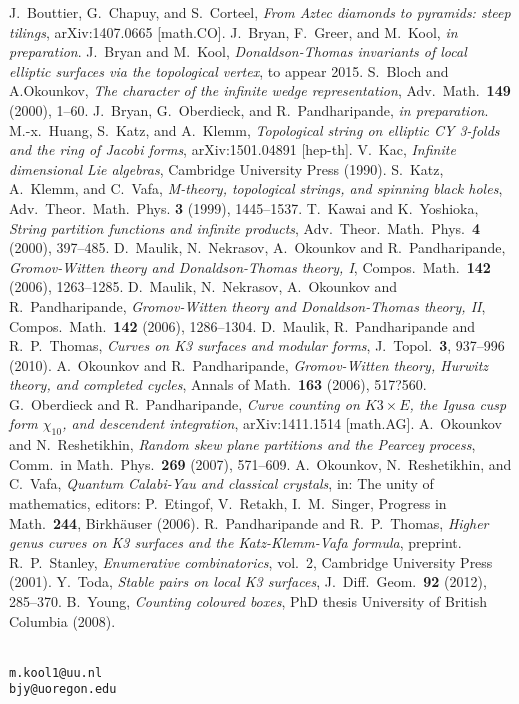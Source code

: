 \documentclass{amsart}
\theoremstyle{definition}
\begin{document}
%
%

\begin{thebibliography}{MNOP}
 J.~Bouttier, G.~Chapuy, and S.~Corteel, \textit{From Aztec diamonds to pyramids: steep tilings}, arXiv:1407.0665 [math.CO].
 J.~Bryan, F.~Greer, and M.~Kool, \emph{in preparation}.
 J.~Bryan and M.~Kool, \textit{Donaldson-Thomas invariants of local elliptic surfaces via the topological vertex}, to appear 2015.
 S.~Bloch and A.Okounkov, \textit{The character of the infinite wedge representation}, Adv.~Math.~\textbf{149} (2000), 1--60.
 J.~Bryan, G.~Oberdieck, and R.~Pandharipande, \emph{in preparation}.
 M.-x.~Huang, S.~Katz, and A.~Klemm, \textit{Topological string on elliptic CY 3-folds and the ring of Jacobi forms}, arXiv:1501.04891 [hep-th].
 V.~Kac, \textit{Infinite dimensional Lie algebras}, Cambridge University Press (1990).
 S.~Katz, A.~Klemm, and C.~Vafa, \textit{M-theory, topological strings, and spinning black holes}, Adv.~Theor.~Math.~Phys. \textbf{3} (1999), 1445--1537.
 T.~Kawai and K.~Yoshioka, \emph{String partition functions and infinite products}, Adv.~Theor.~Math.~Phys.~\textbf{4} (2000), 397--485.
 D.~Maulik, N.~Nekrasov, A.~Okounkov and R.~Pandharipande, \textit{Gromov-{W}itten theory and {D}onaldson-{T}homas theory, {I}}, Compos.~Math.~\textbf{142} (2006), 1263--1285. %
 D.~Maulik, N.~Nekrasov, A.~Okounkov and R.~Pandharipande, \textit{Gromov-{W}itten theory and {D}onaldson-{T}homas theory, {II}}, Compos.~Math.~\textbf{142} (2006), 1286--1304. 
 D.~Maulik, R.~Pandharipande and R.~P.~Thomas, \textit{Curves on K3 surfaces and modular forms}, J.~Topol.~\textbf{3}, 937--996 (2010). %
 A.~Okounkov and R.~Pandharipande, \textit{Gromov-Witten theory, Hurwitz theory, and completed cycles}, Annals of Math.~\textbf{163} (2006), 517?560.
 G.~Oberdieck and R.~Pandharipande, \textit{Curve counting on $K3 \times E$, the Igusa cusp form $\chi_{10}$, and descendent integration}, arXiv:1411.1514 [math.AG].
 A.~Okounkov and N.~Reshetikhin, \textit{Random skew plane partitions and the Pearcey process}, Comm.~in Math.~Phys.~\textbf{269} (2007), 571--609.
 A.~Okounkov, N.~Reshetikhin, and C.~Vafa, \textit{Quantum Calabi-Yau and classical crystals}, in: The unity of mathematics, editors: P.~Etingof, V.~Retakh, I.~M.~Singer, Progress in Math.~\textbf{244}, Birkh\"auser (2006).
 R.~Pandharipande and R.~P.~Thomas, \textit{Higher genus curves on K3 surfaces and the Katz-Klemm-Vafa formula}, preprint.
 R.~P.~Stanley, \textit{Enumerative combinatorics}, vol.~2, Cambridge University Press (2001).
 Y.~Toda, \textit{Stable pairs on local K3 surfaces}, J.~Diff.~Geom.~\textbf{92} (2012), 285--370.
 B.~Young, \textit{Counting coloured boxes}, PhD thesis University of British Columbia (2008).
\end{thebibliography}

 \\
{\tt{m.kool1@uu.nl}} \\
{\tt{bjy@uoregon.edu}}
\end{document}
